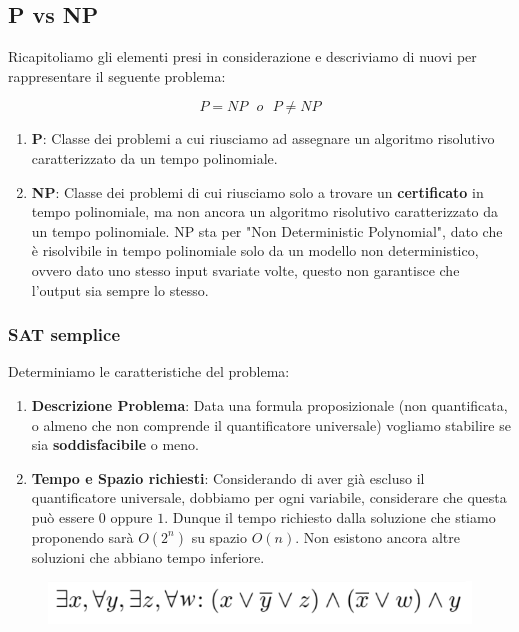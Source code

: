 \documentclass{article}
\begin{document}
\newpage

\subsection{P vs NP} Ricapitoliamo gli elementi presi in considerazione e descriviamo di nuovi per rappresentare il seguente problema:

\begin{equation}
    P = NP \: \: \:  o  \: \: \: P \neq NP
\end{equation}

\begin{enumerate}
    \item \textbf{P}: Classe dei problemi a cui riusciamo ad assegnare un algoritmo risolutivo caratterizzato da un tempo polinomiale.
    \item \textbf{NP}: Classe dei problemi di cui riusciamo solo a trovare un \textbf{certificato} in tempo polinomiale, ma non ancora un algoritmo risolutivo caratterizzato da un tempo polinomiale. NP sta per "Non Deterministic Polynomial", dato che è risolvibile in tempo polinomiale solo da un modello non deterministico, ovvero dato uno stesso input svariate volte, questo non garantisce che l'output sia sempre lo stesso.
\end{enumerate}

\vskip 2cm

\subsubsection{SAT semplice}

Determiniamo le caratteristiche del problema:

\begin{enumerate}
    \item \textbf{Descrizione Problema}: Data una formula proposizionale (non quantificata, o almeno che non comprende il quantificatore universale) vogliamo stabilire se sia \textbf{soddisfacibile} o meno.
    \item \textbf{Tempo e Spazio richiesti}: Considerando di aver già escluso il quantificatore universale, dobbiamo per ogni variabile, considerare che questa può essere $0$ oppure $1$. Dunque il tempo richiesto dalla soluzione che stiamo proponendo sarà $O(2^{n})$ su spazio $O(n)$. Non esistono ancora altre soluzioni che abbiano tempo inferiore.
\end{enumerate}

\begin{figure}[htbp]
    \center
    \includegraphics[scale=0.45]{img/formulaProp1.png}
\end{figure}
\end{document}
